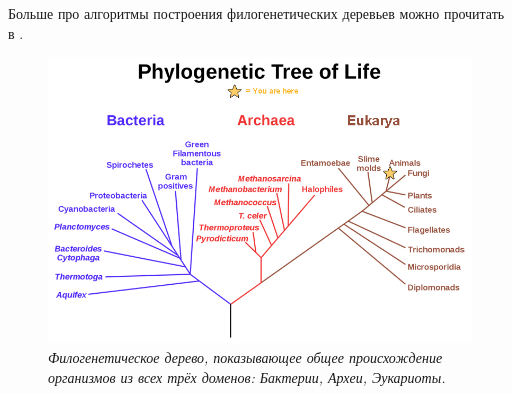 \documentclass[11pt,a4paper]{report}
\theoremstyle{definition}
\theoremstyle{definition}
\theoremstyle{definition}
\begin{document}
	\noindent Больше про алгоритмы построения филогенетических деревьев можно прочитать в \cite{Hungary}.
	\clearpage
	\begin{figure}[!hbtp]
		\includegraphics[width=\textwidth]{./img/phylogenetic_tree.jpg}
		\caption{\textit{Филогенетическое дерево, показывающее общее происхождение организмов из всех трёх доменов: Бактерии, Археи, Эукариоты.}}
	\end{figure}
	\clearpage
\end{document}
